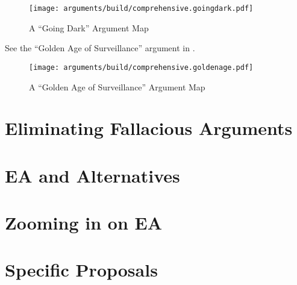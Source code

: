\begin{figure}[h]
  \centering\CaptionFontSize
  \texttt{[image: arguments/build/comprehensive.goingdark.pdf]}
  \caption{A ``Going Dark'' Argument Map}
  \label{fig-arg-going-dark}
\end{figure}

See the ``Golden Age of Surveillance'' argument in .

\begin{figure}[h]
  \centering\CaptionFontSize
  \texttt{[image: arguments/build/comprehensive.goldenage.pdf]}
  \caption{A ``Golden Age of Surveillance'' Argument Map}
  \label{fig-arg-golden-age}
\end{figure}


\section{Eliminating Fallacious Arguments}

\section{EA and Alternatives}

\section{Zooming in on EA}




\section{Specific Proposals}

